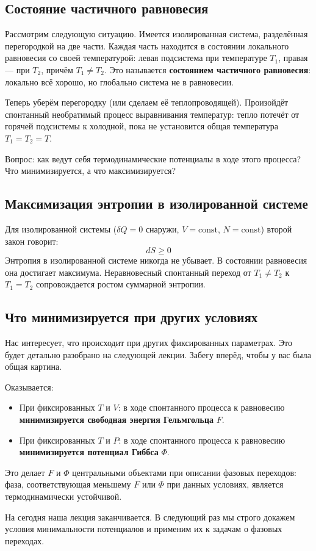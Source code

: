 \documentclass[../general/general]{subfiles}
\begin{document}
\subsection{Состояние частичного равновесия}

Рассмотрим следующую ситуацию. Имеется изолированная система, разделённая перегородкой на две части. Каждая часть находится в состоянии локального равновесия со своей температурой: левая подсистема при температуре $T_1$, правая --- при $T_2$, причём $T_1 \neq T_2$. Это называется \textbf{состоянием частичного равновесия}: локально всё хорошо, но глобально система не в равновесии.

Теперь уберём перегородку (или сделаем её теплопроводящей). Произойдёт спонтанный необратимый процесс выравнивания температур: тепло потечёт от горячей подсистемы к холодной, пока не установится общая температура $T_1 = T_2 = T$.

Вопрос: как ведут себя термодинамические потенциалы в ходе этого процесса? Что минимизируется, а что максимизируется?

\subsection{Максимизация энтропии в изолированной системе}

Для изолированной системы ($\delta Q = 0$ снаружи, $V = \text{const}$, $N = \text{const}$) второй закон говорит:
\begin{equation}
    dS \geq 0
\end{equation}
Энтропия в изолированной системе никогда не убывает. В состоянии равновесия она достигает максимума. Неравновесный спонтанный переход от $T_1 \neq T_2$ к $T_1 = T_2$ сопровождается ростом суммарной энтропии.

\subsection{Что минимизируется при других условиях}

Нас интересует, что происходит при других фиксированных параметрах. Это будет детально разобрано на следующей лекции. Забегу вперёд, чтобы у вас была общая картина.

Оказывается:
\begin{itemize}
    \item При фиксированных $T$ и $V$: в ходе спонтанного процесса к равновесию \textbf{минимизируется свободная энергия Гельмгольца} $F$.
    \item При фиксированных $T$ и $P$: в ходе спонтанного процесса к равновесию \textbf{минимизируется потенциал Гиббса} $\Phi$.
\end{itemize}

Это делает $F$ и $\Phi$ центральными объектами при описании фазовых переходов: фаза, соответствующая меньшему $F$ или $\Phi$ при данных условиях, является термодинамически устойчивой.

На сегодня наша лекция заканчивается. В следующий раз мы строго докажем условия минимальности потенциалов и применим их к задачам о фазовых переходах.

\end{document}
